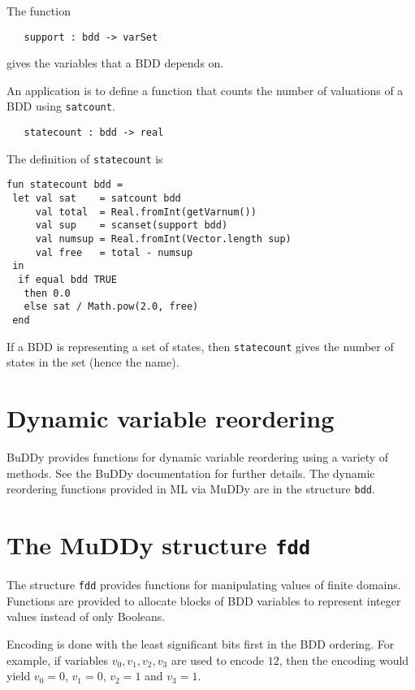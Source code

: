 \documentclass[12pt]{article}
\newcommand{\bnind}[1]{\index[MLbn]{#1}}
\renewcommand{\t}[1]{\mbox{\tt #1}}
\newcommand{\ml}[1]{{\tt #1}}
\newcommand{\Buddy}{BuDDy\xspace}
\newcommand{\Muddy}{MuDDy\xspace}
\begin{document}
The function

\begin{verbatim}
   support : bdd -> varSet
\end{verbatim}\bnind{\ml{support}}

gives the variables that a BDD depends on. 

An application is to define
a function that counts the number of valuations of a BDD using
\t{satcount}.

\begin{verbatim}
   statecount : bdd -> real
\end{verbatim}\bnind{\ml{statecount}}

The
definition of \t{statecount} is

\newpage

\begin{verbatim}
fun statecount bdd =
 let val sat    = satcount bdd
     val total  = Real.fromInt(getVarnum())
     val sup    = scanset(support bdd)
     val numsup = Real.fromInt(Vector.length sup)
     val free   = total - numsup
 in 
  if equal bdd TRUE 
   then 0.0
   else sat / Math.pow(2.0, free)
 end
\end{verbatim}

If a BDD is representing a set of states, then \t{statecount} gives
the number of states in the set (hence the name).

\section{Dynamic variable reordering}

\Buddy{} provides functions for dynamic variable reordering using a variety of methods.
See the \Buddy{} documentation \cite{BuDDy} for further details. The dynamic reordering
functions provided in ML via \Muddy{} are in the structure \t{bdd}.

\section{The \Muddy{} structure \t{fdd}}\label{fdd}

The structure \t{fdd} provides functions for manipulating values of finite domains.
Functions are provided to allocate blocks of BDD variables to represent integer values instead
of only Booleans.

Encoding is done with the least significant bits first in the BDD ordering. For example, if variables
$v_0, v_1, v_2, v_3$ are used to encode $12$, then the encoding would yield
$v_0=0$, $v_1=0$, $v_2=1$ and $v_3=1$.
\end{document}
